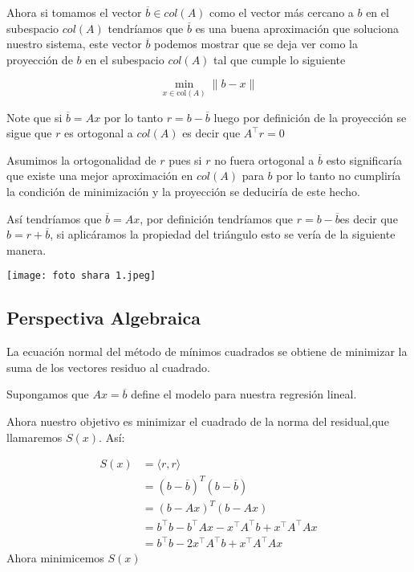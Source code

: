\documentclass[12pt]{article}
\begin{document}
Ahora si tomamos el vector $\overline{b}\in col(A)$ como el vector m\'as cercano a $b$ en el subespacio $col(A)$ tendr\'iamos que $\overline{b}$ es una buena aproximaci\'on que soluciona nuestro sistema, este vector $\overline{b}$ podemos mostrar que se deja ver como la proyecci\'on  de $b$ en el subespacio $col(A)$  tal que cumple lo siguiente 

\[
\min_{x \in \text{col}(A)} \| b - x \|
\]

Note que si $\overline{b}=Ax$ por lo tanto $r=b-\overline{b}$ luego por definición de la proyecci\'on  se sigue que $r$ es ortogonal a $col(A)$ es decir que $A^\top r=0$ 

Asumimos la ortogonalidad de $r$ pues si $r$ no fuera ortogonal a $\overline{b}$ esto significar\'ia que existe una mejor aproximaci\'on en $col(A)$ para $b$ por lo tanto no cumplir\'ia la condici\'on de minimizaci\'on y la proyecci\'on se deducir\'ia  de este hecho.

As\'i tendr\'iamos que $\overline{b}=Ax$, por definici\'on tendr\'iamos que $r=b-\overline{b}$es decir que $b=r+\overline{b}$, si aplicáramos la propiedad del triángulo esto se ver\'ia de la siguiente manera.

\texttt{[image: foto shara 1.jpeg]}

\vspace{0.5cm}


 
\vspace{6.5cm}
 




\begin{center}    
\section{Perspectiva Algebraica}
\end{center}

 La ecuaci\'on normal del método de mínimos cuadrados se obtiene de minimizar la suma de los vectores residuo al cuadrado.

 Supongamos que $Ax=\overline{b}$ define el modelo para nuestra regresi\'on lineal.

 Ahora nuestro objetivo es minimizar el cuadrado de la norma del residual,que  llamaremos  $S(x)$. Así:

 \begin{align*}
     S(x)&=\langle r,r\rangle\\
     &=(b-\overline{b})^T(b-\overline{b})\\
     &=(b-Ax)^T(b-Ax)\\  
     &=b^\top b - b^\top Ax - x^\top A^\top b + x^\top A^\top A x\\
     &=b^\top b - 2 x^\top A^\top b + x^\top A^\top A x
 \end{align*}
Ahora minimicemos $S(x)$
\end{document}
